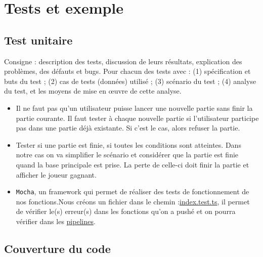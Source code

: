 \section{Tests et exemple}
\subsection{Test unitaire}

Consigne : description des tests, discussion de leurs résultats, explication des problèmes, des défauts et bugs. Pour chacun des tests avec : (1) spécification et buts du test ;
(2) cas de tests (données) utilisé ; (3) scénario du test ; (4) analyse du test, et les moyens de mise en œuvre de cette analyse.

\begin{itemize}
    \item Il ne faut pas qu'un utilisateur puisse lancer une nouvelle partie sans finir la partie courante. Il faut tester à chaque nouvelle partie si l'utilisateur participe pas dans une partie déjà existante. Si c'est le cas, alors refuser la partie.
    \item Tester si une partie est finie, si toutes les conditions sont atteintes. Dans notre cas on va simplifier le scénario et considérer que la partie est finie quand la base principale est prise. La perte de celle-ci doit finir la partie et afficher le joueur gagnant.
    \item \lstinline{Mocha}, un framework qui permet de réaliser des tests de fonctionnement de nos fonctions.Nous créons un fichier dans le chemin :\href{https://gitlab.emi.u-bordeaux.fr/vsamson/desert-fox/-/blob/main/src/backend/src/test/index.test.ts}{index.test.ts}, il permet de vérifier le(s) erreur(s) dans les fonctions qu'on a pushé et on pourra vérifier dans les \href{https://gitlab.emi.u-bordeaux.fr/vsamson/desert-fox/-/pipelines}{pipelines}.
    
    
\end{itemize}

\subsection{Couverture du code}

